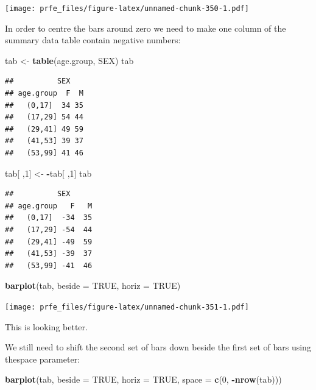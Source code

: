 \documentclass[12pt,]{book}
\newenvironment{Shaded}{\begin{snugshade}}{\end{snugshade}}
\newcommand{\KeywordTok}[1]{\textcolor[rgb]{0.13,0.29,0.53}{\textbf{#1}}}
\newcommand{\DataTypeTok}[1]{\textcolor[rgb]{0.13,0.29,0.53}{#1}}
\newcommand{\DecValTok}[1]{\textcolor[rgb]{0.00,0.00,0.81}{#1}}
\newcommand{\StringTok}[1]{\textcolor[rgb]{0.31,0.60,0.02}{#1}}
\newcommand{\OtherTok}[1]{\textcolor[rgb]{0.56,0.35,0.01}{#1}}
\newcommand{\OperatorTok}[1]{\textcolor[rgb]{0.81,0.36,0.00}{\textbf{#1}}}
\newcommand{\NormalTok}[1]{#1}
\theoremstyle{definition}
\theoremstyle{definition}
\theoremstyle{definition}
\theoremstyle{remark}
\begin{document}
\texttt{[image: prfe\_files/figure-latex/unnamed-chunk-350-1.pdf]}

In order to centre the bars around zero we need to make one column of
the summary data table contain negative numbers:

\begin{Shaded}
\begin{Highlighting}[]
\NormalTok{tab <-}\StringTok{ }\KeywordTok{table}\NormalTok{(age.group, SEX)}
\NormalTok{tab}
\end{Highlighting}
\end{Shaded}

\begin{verbatim}
##          SEX
## age.group  F  M
##   (0,17]  34 35
##   (17,29] 54 44
##   (29,41] 49 59
##   (41,53] 39 37
##   (53,99] 41 46
\end{verbatim}

\begin{Shaded}
\begin{Highlighting}[]
\NormalTok{tab[ ,}\DecValTok{1}\NormalTok{] <-}\StringTok{ }\OperatorTok{-}\NormalTok{tab[ ,}\DecValTok{1}\NormalTok{]}
\NormalTok{tab}
\end{Highlighting}
\end{Shaded}

\begin{verbatim}
##          SEX
## age.group   F   M
##   (0,17]  -34  35
##   (17,29] -54  44
##   (29,41] -49  59
##   (41,53] -39  37
##   (53,99] -41  46
\end{verbatim}

\begin{Shaded}
\begin{Highlighting}[]
\KeywordTok{barplot}\NormalTok{(tab, }\DataTypeTok{beside =} \OtherTok{TRUE}\NormalTok{, }\DataTypeTok{horiz =} \OtherTok{TRUE}\NormalTok{)}
\end{Highlighting}
\end{Shaded}

\texttt{[image: prfe\_files/figure-latex/unnamed-chunk-351-1.pdf]}

This is looking better.

We still need to shift the second set of bars down beside the first set
of bars using thespace parameter:

\begin{Shaded}
\begin{Highlighting}[]
\KeywordTok{barplot}\NormalTok{(tab, }\DataTypeTok{beside =} \OtherTok{TRUE}\NormalTok{, }\DataTypeTok{horiz =} \OtherTok{TRUE}\NormalTok{, }\DataTypeTok{space =} \KeywordTok{c}\NormalTok{(}\DecValTok{0}\NormalTok{, }\OperatorTok{-}\KeywordTok{nrow}\NormalTok{(tab)))}
\end{Highlighting}
\end{Shaded}
\end{document}
